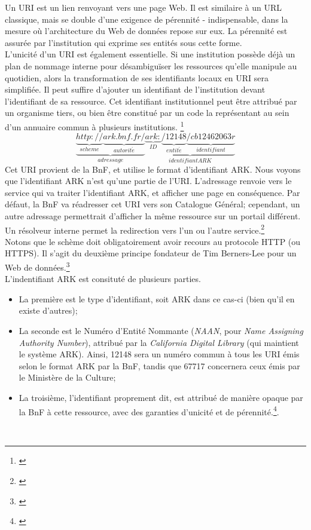 \documentclass[a4paper,12pt,twoside]{book}
\begin{document}
Un URI est un lien renvoyant vers une page Web. Il est similaire à un URL classique, mais se double d'une exigence de pérennité - indispensable, dans la mesure où l'architecture du Web de données repose sur eux. La pérennité est assurée par l'institution qui exprime ses entités sous cette forme.\\

L'unicité d'un URI est également essentielle. Si une institution possède déjà un plan de nommage interne pour désambiguïser les ressources qu'elle manipule au quotidien, alors la transformation de ses identifiants locaux en URI sera simplifiée. Il peut suffire d'ajouter un identifiant de l'institution devant l'identifiant de sa ressource. Cet identifiant institutionnel peut être attribué par un organisme tiers, ou bien être constitué par un code la représentant au sein d'un annuaire commun à plusieurs institutions. \footnote{\cite{ministeredelacultureetdelacommunicationIdentifiantsPerennesPour2014}}\\

\large
$$
\underbrace{\underbrace{http://}_{scheme}\underbrace{ark.bnf.fr/}_{autorit\acute{e}}}_{adressage}\underbrace{\underbrace{ark:}_{ID}\underbrace{/12148}_{entit\acute{e}}\underbrace{/cb12462063r}_{identifiant}}_{identifiant ARK}
$$
\normalsize
Cet URI provient de la BnF, et utilise le format d'identifiant ARK. Nous voyons que l'identifiant ARK n'est qu'une partie de l'URI. L'adressage renvoie vers le service qui va traiter l'identifiant ARK, et afficher une page en conséquence. Par défaut, la BnF va réadresser cet URI vers son Catalogue Général; cependant, un autre adressage permettrait d'afficher la même ressource sur un portail différent. Un résolveur interne permet la redirection vers l'un ou l'autre service.\footnote{\cite{ministeredelacultureetdelacommunicationIdentifiantsPerennesPour2014}}\\

Notons que le schème doit obligatoirement avoir recours au protocole HTTP (ou HTTPS). Il s'agit du deuxième principe fondateur de Tim Berners-Lee pour un Web de données.\footnote{\cite{berners-leeLinkedData2006}}\\

L'indentifiant ARK est consituté de plusieurs parties. 
\begin{itemize}
    \item La première est le type d'identifiant, soit ARK dans ce cas-ci (bien qu'il en existe d'autres);
    \item La seconde est le Numéro d'Entité Nommante (\textit{NAAN}, pour \textit{Name Assigning Authority Number}), attribué par la \textit{California Digital Library} (qui maintient le système ARK). Ainsi, 12148 sera un numéro commun à tous les URI émis selon le format ARK par la BnF, tandis que 67717 concernera ceux émis par le Ministère de la Culture;
    \item La troisième, l'identifiant proprement dit, est attribué de manière opaque par la BnF à cette ressource, avec des garanties d'unicité et de pérennité.\footnote{\cite{bibliothequenationaledefranceIdentifiantARKArchival2018}}.
\end{itemize}\\
\end{document}
